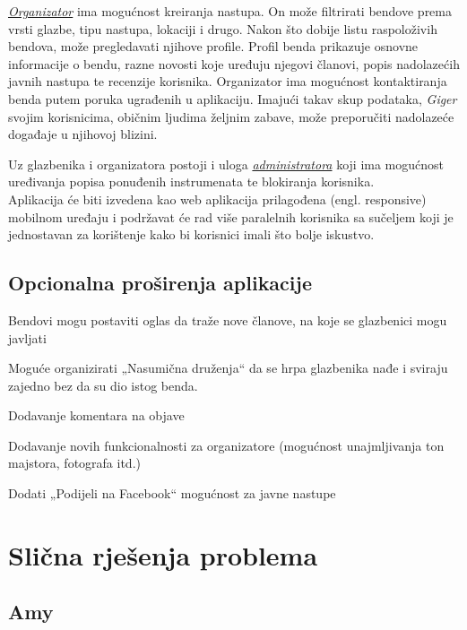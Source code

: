 		\textit{\underline{Organizator}} ima mogućnost kreiranja nastupa. On može filtrirati bendove prema vrsti glazbe, tipu nastupa, lokaciji i drugo. Nakon što dobije listu raspoloživih bendova, može pregledavati njihove profile. Profil benda prikazuje osnovne informacije o bendu, razne novosti koje uređuju njegovi članovi, popis nadolazećih javnih nastupa te recenzije korisnika. Organizator ima mogućnost kontaktiranja benda putem poruka ugrađenih u aplikaciju. Imajući takav skup podataka, \textit{Giger} svojim korisnicima, običnim ljudima željnim zabave, može preporučiti nadolazeće događaje u njihovoj blizini.
		
		Uz glazbenika i organizatora postoji i uloga \textit{\underline{administratora}} koji ima mogućnost uređivanja popisa ponuđenih instrumenata te blokiranja korisnika.
		\\
		
		Aplikacija će biti izvedena kao web aplikacija prilagođena (engl. responsive) mobilnom uređaju i podržavat će rad više paralelnih korisnika sa sučeljem koji je jednostavan za korištenje kako bi korisnici imali što bolje iskustvo.
		
		\subsection{Opcionalna proširenja aplikacije}
		
		\begin{packed_item}
			\item Bendovi mogu postaviti oglas da traže nove članove, na koje se glazbenici mogu javljati
			\item Moguće organizirati „Nasumična druženja“ da se hrpa glazbenika nađe i sviraju zajedno bez da su dio istog benda.
			\item Dodavanje komentara na objave
			\item Dodavanje novih funkcionalnosti za organizatore (mogućnost unajmljivanja ton majstora, fotografa itd.)
			\item Dodati „Podijeli na Facebook“ mogućnost za javne nastupe
		\end{packed_item}
		
		
		
		\section{Slična rješenja problema}
		
		\subsection{Amy}
		

